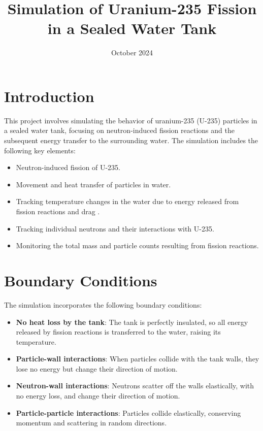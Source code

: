 \documentclass[twocolumn, 11pt]{article}
\title{Simulation of Uranium-235 Fission in a Sealed Water Tank}
\date{October 2024}
\makeatletter
\renewcommand{\maketitle}{\bgroup
  \centering
  {\LARGE \bfseries \color{darkpurple} \@title \par}
  \vskip 1em
  {\large \color{darkpurple} \@author \par}
  \vskip 1em
  {\footnotesize \@date \color{darkpurple}\par}
  \egroup
}
\makeatother
\begin{document}
\twocolumn[
\begin{@twocolumnfalse}
    \maketitle
    \vspace{10pt}
\end{@twocolumnfalse}
]

\section*{Introduction}
This project involves simulating the behavior of uranium-235 (U-235) particles in a sealed water tank, focusing on neutron-induced fission reactions and the subsequent energy transfer to the surrounding water. The simulation includes the following key elements:
\begin{itemize}
    \item Neutron-induced fission of U-235.
    \item Movement and heat transfer of particles in water.
    \item Tracking temperature changes in the water due to energy released from fission reactions and drag .
    \item Tracking individual neutrons and their interactions with U-235.
    \item Monitoring the total mass and particle counts resulting from fission reactions.
\end{itemize}

\section*{Boundary Conditions}
The simulation incorporates the following boundary conditions:
\begin{itemize}
    \item \textbf{No heat loss by the tank}: The tank is perfectly insulated, so all energy released by fission reactions is transferred to the water, raising its temperature.
    \item \textbf{Particle-wall interactions}: When particles collide with the tank walls, they lose no energy but change their direction of motion.
    \item \textbf{Neutron-wall interactions}: Neutrons scatter off the walls elastically, with no energy loss, and change their direction of motion.
    \item \textbf{Particle-particle interactions}: Particles collide elastically, conserving momentum and scattering in random directions.
\end{itemize}
\end{document}
